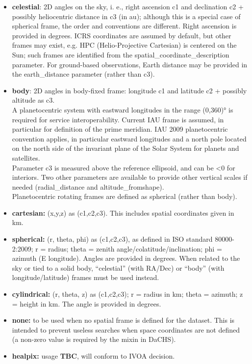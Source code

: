 \documentclass[11pt,a4paper]{ivoa}
\begin{document}
\begin{itemize}

\item \textbf{celestial}: 2D angles on the sky, i. e., right ascension c1 and declination c2 + possibly heliocentric distance in c3 (in au); although this is a special case of spherical frame, the order and conventions are different. Right ascension is provided in degrees. ICRS coordinates are assumed by default, but other frames may exist, e.g. HPC (Helio-Projective Cartesian) is centered on the Sun; such frames are identified from the spatial\_coordinate\_description parameter. For ground-based observations, Earth distance may be provided in the earth\_distance parameter (rather than c3). 

\item \textbf{body}: 2D angles in body-fixed frame: longitude c1 and latitude c2 + possibly altitude as c3. \\A planetocentric system with eastward longitudes in the range (0,360)° is required for service interoperability. Current IAU frame is assumed, in particular for definition of the prime meridian. IAU 2009 planetocentric convention applies, in particular eastward longitudes and a north pole located on the north side of the invariant plane of the Solar System for planets and satellites.  \\Parameter c3 is measured above the reference ellipsoid, and can be <0 for interiors. Two other parameters are available to provide other vertical scales if needed (radial\_distance and altitude\_fromshape). \\Planetocentric rotating frames are defined as spherical (rather than body).

\item \textbf{cartesian:} (x,y,z) as (c1,c2,c3). This includes spatial coordinates given in km. 

\item \textbf{spherical:} (r, theta, phi) as (c1,c2,c3), as defined in ISO standard 80000-2:2009; r = radius; theta = zenith angle/colatitude/inclination; phi = azimuth (E longitude). Angles are provided in degrees. When related to the sky or tied to a solid body, ``celestial'' (with RA/Dec) or ``body'' (with longitude/latitude) frames must be used instead.

\item \textbf{cylindrical:} (r, theta, z) as (c1,c2,c3); r = radius in km; theta = azimuth; z = height in km. The angle is provided in degrees.

\item \textbf{none:} to be used when no spatial frame is defined for the dataset. This is intended to prevent useless searches when space coordinates are not defined (a non-zero value is required by the mixin in DaCHS).

\item \textbf{healpix:} usage \textbf{TBC}, will conform to IVOA decision.

\end{itemize}
\end{document}
